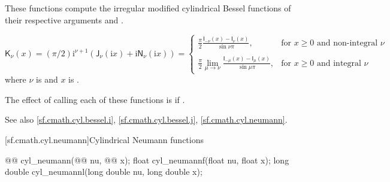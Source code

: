 \begin{itemdescr}

\pnum
\effects
These functions compute
the irregular modified cylindrical Bessel functions
of their respective arguments
 and .

\pnum
\returns
\[%
  \mathsf{K}_\nu(x) =
  (\pi/2)\mathrm{i}^{\nu+1} (            \mathsf{J}_\nu(\mathrm{i}x)
			    + \mathrm{i} \mathsf{N}_\nu(\mathrm{i}x)
			    )
  =
  \left\{
  \begin{array}{cl}
  \displaystyle
  \frac{\pi}{2}
  \frac{\mathsf{I}_{-\nu}(x) - \mathsf{I}_{\nu}(x)}
       {\sin \nu\pi },
  & \mbox{for $x \ge 0$ and non-integral $\nu$}
  \\
  \\
  \displaystyle
  \frac{\pi}{2}
  \lim_{\mu \rightarrow \nu} \frac{\mathsf{I}_{-\mu}(x) - \mathsf{I}_{\mu}(x)}
                                  {\sin \mu\pi },
  & \mbox{for $x \ge 0$ and integral $\nu$}
  \end{array}
  \right.
\]
where
$\nu$ is  and
$x$ is .

\pnum
\remarks
The effect of calling each of these functions
is 
if .

\pnum
See also \ref{sf.cmath.cyl.bessel.i}, \ref{sf.cmath.cyl.bessel.j}, \ref{sf.cmath.cyl.neumann}.
\end{itemdescr}

[sf.cmath.cyl.neumann]{Cylindrical Neumann functions}%
%
%
%
%
%
%
\begin{itemdecl}
@@ cyl_neumann(@@ nu, @@ x);
float        cyl_neumannf(float nu, float x);
long double  cyl_neumannl(long double nu, long double x);
\end{itemdecl}

